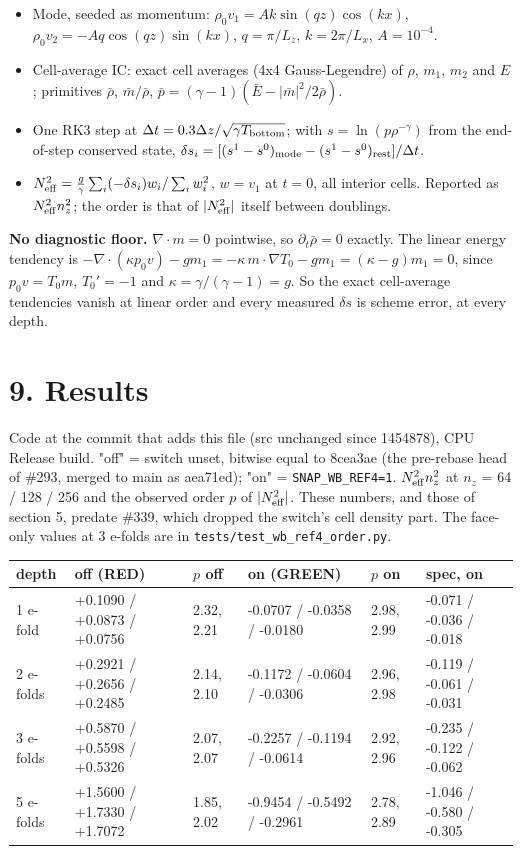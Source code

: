 \documentclass[11pt,a4paper]{article}
\begin{document}
\begin{itemize}
\item Mode, seeded as momentum: $\rho_0 v_1 = Ak\sin(qz)\cos(kx)$, $\rho_0 v_2 = -Aq\cos(qz)\sin(kx)$,
  $q = \pi/L_z$, $k = 2\pi/L_x$, $A = 10^{-4}$.
\item Cell-average IC: exact cell averages (4x4 Gauss-Legendre) of $\rho$, $m_1$, $m_2$ and $E$; primitives
  $\bar\rho$, $\bar m/\bar\rho$, $\bar p = (\gamma-1)(\bar E - \lvert\bar m\rvert^2/2\bar\rho)$.
\item One RK3 step at $\Delta t = 0.3\Delta z/\sqrt{\gamma T_{\rm bottom}}$; with $s = \ln(p\rho^{-\gamma})$ from the
  end-of-step conserved state, $\delta s_i = [(s^1 - s^0)_{\rm mode} - (s^1 - s^0)_{\rm rest}]/\Delta t$.
\item $N^2_{\rm eff} = \tfrac g\gamma \sum_i(-\delta s_i)w_i / \sum_i w_i^2$, $w = v_1$ at $t = 0$, all interior cells.
  Reported as $N^2_{\rm eff}n_z^2$; the order is that of $\lvert N^2_{\rm eff}\rvert$ itself between doublings.
\end{itemize}

\textbf{No diagnostic floor.} $\nabla\cdot m = 0$ pointwise, so $\partial_t\bar\rho = 0$ exactly. The linear energy
tendency is $-\nabla\cdot(\kappa p_0 v) - g m_1 = -\kappa\, m\cdot\nabla T_0 - g m_1 = (\kappa - g)m_1 = 0$, since
$p_0v = T_0 m$, $T_0' = -1$ and $\kappa = \gamma/(\gamma-1) = g$. So the exact cell-average tendencies vanish at
linear order and every measured $\delta s$ is scheme error, at every depth.

\section*{9. Results}

Code at the commit that adds this file (src unchanged since 1454878), CPU Release build. "off" = switch
unset, bitwise equal to 8cea3ae (the pre-rebase head of \#293, merged to main as aea71ed); "on" = \texttt{SNAP\_WB\_REF4=1}. $N^2_{\rm eff}n_z^2$ at $n_z$ = 64 / 128 / 256 and the
observed order $p$ of $\lvert N^2_{\rm eff}\rvert$. These numbers, and those of section 5, predate \#339, which
dropped the switch's cell density part. The face-only values at 3 e-folds are in \texttt{tests/test\_wb\_ref4\_order.py}.

\begin{longtable}{llllll}
\toprule
depth & off (RED) & $p$ off & on (GREEN) & $p$ on & spec, on \\
\midrule
1 e-fold & +0.1090 / +0.0873 / +0.0756 & 2.32, 2.21 & -0.0707 / -0.0358 / -0.0180 & 2.98, 2.99 & -0.071 / -0.036 / -0.018 \\
2 e-folds & +0.2921 / +0.2656 / +0.2485 & 2.14, 2.10 & -0.1172 / -0.0604 / -0.0306 & 2.96, 2.98 & -0.119 / -0.061 / -0.031 \\
3 e-folds & +0.5870 / +0.5598 / +0.5326 & 2.07, 2.07 & -0.2257 / -0.1194 / -0.0614 & 2.92, 2.96 & -0.235 / -0.122 / -0.062 \\
5 e-folds & +1.5600 / +1.7330 / +1.7072 & 1.85, 2.02 & -0.9454 / -0.5492 / -0.2961 & 2.78, 2.89 & -1.046 / -0.580 / -0.305 \\
\bottomrule
\end{longtable}
\end{document}
